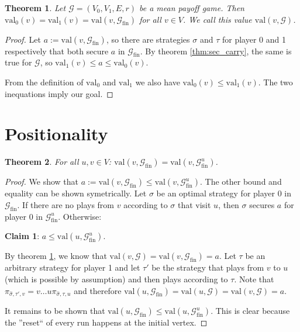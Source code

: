 \documentclass{article}
\newtheorem{theorem}{Theorem}
\begin{document}
\begin{theorem}
\label{thm:inf_determined}
	Let $\mathcal{G} = (V_0, V_1, E, r)$ be a mean payoff game. Then $\text{val}_0(v) = \text{val}_1(v) = \text{val}(v, \mathcal{G}_\text{fin})$ for all $v \in V$. We call this value $\text{val}(v, \mathcal{G})$.
\end{theorem}
\begin{proof}
	Let $a := \text{val}(v, \mathcal{G}_\text{fin})$, so there are strategies $\sigma$ and $\tau$ for player 0 and 1 respectively that both secure $a$ in $\mathcal{G}_\text{fin}$. By theorem \ref{thm:sec_carry}, the same is true for $\mathcal{G}$, so $\text{val}_1(v) \leq a \leq \text{val}_0(v)$. 
	
	From the definition of $\text{val}_0$ and $\text{val}_1$ we also have $\text{val}_0(v) \leq \text{val}_1(v)$. The two inequations imply our goal.
\end{proof}

\section{Positionality}
\begin{theorem}
\label{thm:fin_ufin_eq}
	For all $u, v \in V$: $\text{val}(v, \mathcal{G}_\text{fin}) = \text{val}(v, \mathcal{G}^u_\text{fin})$.
\end{theorem}
\begin{proof}
	We show that $a := \text{val}(v, \mathcal{G}_\text{fin}) \leq \text{val}(v, \mathcal{G}^u_\text{fin})$. The other bound and equality can be shown symetrically. Let $\sigma$ be an optimal strategy for player 0 in $\mathcal{G}_\text{fin}$. If there are no plays from $v$ according to $\sigma$ that visit $u$, then $\sigma$ secures $a$ for player 0 in $\mathcal{G}^u_\text{fin}$. Otherwise:

	\textbf{Claim 1}: $a \leq \text{val}(u, \mathcal{G}^u_\text{fin})$.
	
	By theorem \ref{thm:inf_determined}, we know that $\text{val}(v, \mathcal{G}) = \text{val}(v, \mathcal{G}_\text{fin}) = a$. Let $\tau$ be an arbitrary strategy for player 1 and let $\tau'$ be the strategy that plays from $v$ to $u$ (which is possible by assumption) and then plays according to $\tau$. Note that $\pi_{\hat{\sigma},\tau',v} = v \dots u \pi_{\hat{\sigma},\tau,u}$ and therefore $\text{val}(u, \mathcal{G}_\text{fin}) = \text{val}(u, \mathcal{G}) = \text{val}(v, \mathcal{G}) = a$.
	
	It remains to be shown that $\text{val}(u, \mathcal{G}_\text{fin}) \leq \text{val}(u, \mathcal{G}^u_\text{fin})$. This is clear because the ''reset`` of every run happens at the initial vertex. 
\end{proof}
\end{document}
